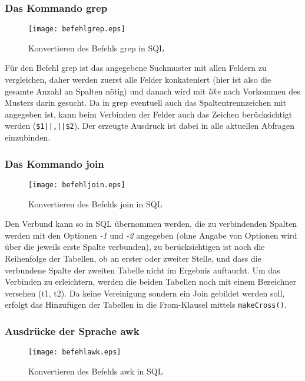 \subsubsection{Das Kommando grep}

\begin{figure}[h]
\centering
\texttt{[image: befehlgrep.eps]}
\caption{Konvertieren des Befehls grep in SQL}
\label{fig:grep}
\end{figure}

Für den Befehl grep ist das angegebene Suchmuster mit allen Feldern zu vergleichen, daher werden zuerst alle Felder konkateniert (hier ist also die gesamte Anzahl an Spalten nötig) und danach wird mit \textit{like} nach Vorkommen des Musters darin gesucht. Da in grep eventuell auch das Spaltentrennzeichen mit angegeben ist, kann beim Verbinden der Felder auch das Zeichen berücksichtigt werden (\lstinline{$1||,||$2}).
Der erzeugte Ausdruck ist dabei in alle aktuellen Abfragen einzubinden.

\subsubsection{Das Kommando join}

\begin{figure}[h]
\centering
\texttt{[image: befehljoin.eps]}
\caption{Konvertieren des Befehls join in SQL}
\label{fig:join}
\end{figure}

Den Verbund kann so in SQL übernommen werden, die zu verbindenden Spalten werden mit den Optionen \textit{-1} und \textit{-2} angegeben (ohne Angabe von Optionen wird über die jeweils erste Spalte verbunden), zu berücksichtigen ist noch die Reihenfolge der Tabellen, ob an erster oder zweiter Stelle, und dass die verbundene Spalte der zweiten Tabelle nicht im Ergebnis auftaucht. Um das Verbinden zu erleichtern, werden die beiden Tabellen noch mit einem Bezeichner versehen (t1, t2). Da keine Vereinigung sondern ein Join gebildet werden soll, erfolgt das Hinzufügen der Tabellen in die From-Klausel mittels \lstinline{makeCross()}.

\subsubsection{Ausdrücke der Sprache awk}

\begin{figure}[h]
\centering
\texttt{[image: befehlawk.eps]}
\caption{Konvertieren des Befehls awk in SQL}
\label{fig:awk}
\end{figure}

